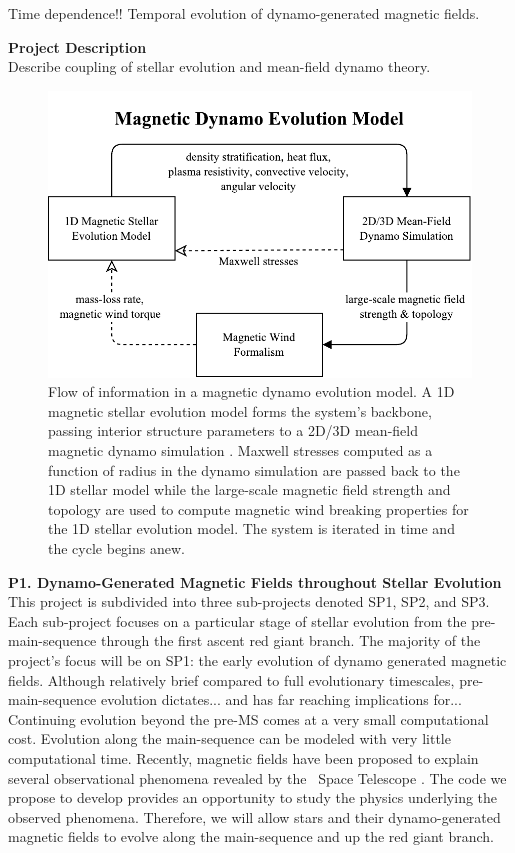 \documentclass[12pt,a4paper]{article}
\begin{document}
Time dependence!! Temporal evolution of dynamo-generated magnetic fields.



{\bf \large Project Description} \\
Describe coupling of stellar evolution and mean-field dynamo theory. 

\begin{figure}
	\centering
	\includegraphics[width=0.75\linewidth]{./fig/dynamo_evolution.pdf}
	\caption{\small Flow of information in a magnetic dynamo evolution model. A 1D magnetic stellar evolution model \citep[{\sc dmestar};][]{FC12b} forms the system's backbone, passing interior structure parameters to a 2D/3D mean-field magnetic dynamo simulation \citep[{\sc pencil} code;][]{Brandenburg2002}. Maxwell stresses computed as a function of radius in the dynamo simulation are passed back to the 1D stellar model while the large-scale magnetic field strength and topology are used to compute magnetic wind breaking properties \citep[e.g.,][]{Reville2015} for the 1D stellar evolution model. The system is iterated in time and the cycle begins anew.}
	\label{fig:schematic}
\end{figure}

\textbf{P1. Dynamo-Generated Magnetic Fields throughout Stellar Evolution} \\
This project is subdivided into three sub-projects denoted SP1, SP2, and SP3. Each sub-project focuses on a particular stage of stellar evolution from the pre-main-sequence through the first ascent red giant branch. The majority of the project's focus will be on SP1: the early evolution of dynamo generated magnetic fields. Although relatively brief compared to full evolutionary timescales, pre-main-sequence evolution dictates... and has far reaching implications for... Continuing evolution beyond the pre-MS comes at a very small computational cost. Evolution along the main-sequence can be modeled with very little computational time. Recently, magnetic fields have been proposed to explain several observational phenomena revealed by the \kepler\ Space Telescope \citep{Fuller2015, vanSaders2016}. The code we propose to develop provides an opportunity to study the physics underlying the observed phenomena. Therefore, we will allow stars and their dynamo-generated magnetic fields to evolve along the main-sequence and up the red giant branch. 
\end{document}
